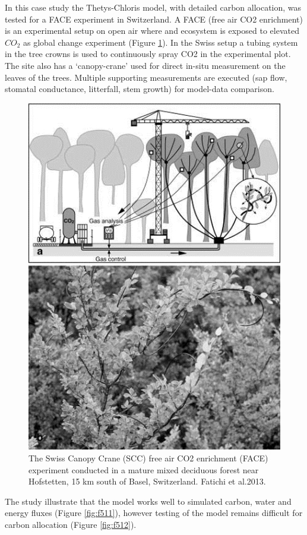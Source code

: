 \documentclass[12pt,oneside]{book}
\begin{document}
In this case study the Thetys-Chloris model, with detailed carbon
allocation, was tested for a FACE experiment in Switzerland. A FACE
(free air CO2 enrichment) is an experimental setup on open air where and
ecosystem is exposed to elevated \(CO_2\) as global change experiment
(Figure \ref{fig:f510}). In the Swiss setup a tubing system in the tree
crowns is used to continuously spray CO2 in the experimental plot. The
site also has a `canopy-crane' used for direct in-situ measurement on
the leaves of the trees. Multiple supporting measurements are executed
(sap flow, stomatal conductance, litterfall, stem growth) for model-data
comparison.

\begin{figure}

{\centering \includegraphics[width=0.8\linewidth]{figures/chap5/f510_face} 

}

\caption{The Swiss Canopy Crane (SCC) free air CO2 enrichment (FACE) experiment conducted in a mature mixed deciduous forest near Hofstetten, 15 km south of Basel, Switzerland. Fatichi et al.2013. }\label{fig:f510}
\end{figure}

The study illustrate that the model works well to simulated carbon,
water and energy fluxes (Figure \ref{fig:f511}), however testing of the
model remains difficult for carbon allocation (Figure \ref{fig:f512}).
\end{document}
